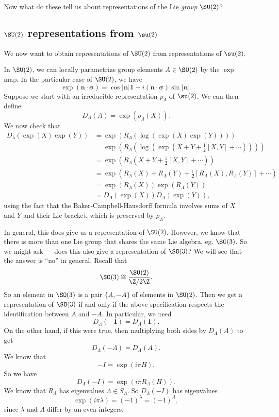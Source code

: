 \documentclass[a4paper]{article}
\begin{document}
Now what do these tell us about representations of the Lie \emph{group} $\SU(2)$?

\subsection{\texorpdfstring{$\SU(2)$}{SU(2)} representations from \texorpdfstring{$\su(2)$}{su(2)}}
We now want to obtain representations of $\SU(2)$ from representations of $\su(2)$.

In $\SU(2)$, we can locally parametrize group elements $A \in \SU(2)$ by the $\exp$ map. In the particular case of $\SU(2)$, we have
\[
  \exp(\mathbf{n}\cdot \boldsymbol \sigma) = \cos|\mathbf{n}| \mathbf{1} + i (\mathbf{n}\cdot \boldsymbol\sigma) \sin |\mathbf{n}|.
\]
Suppose we start with an irreducible representation $\rho_\Lambda$ of $\su(2)$. We can then define
\[
  D_{\Lambda}(A) = \exp(\rho_\Lambda(X)).
\]
We now check that
\begin{align*}
  D_\lambda(\exp(X) \exp(Y)) &= \exp(R_\Lambda(\log(\exp(X)\exp(Y))))\\
  &= \exp\left(R_\Lambda\left(\log\left(\exp\left(X + Y + \frac{1}{2}[X, Y] + \cdots\right)\right)\right)\right)\\
  &= \exp\left(R_\Lambda\left(X + Y + \frac{1}{2}[X, Y] + \cdots\right)\right)\\
  &= \exp\left(R_\Lambda(X) + R_\Lambda(Y) + \frac{1}{2}[R_\Lambda(X), R_\Lambda(Y)] + \cdots\right)\\
  &= \exp(R_\Lambda(X))\exp(R_\Lambda(Y))\\
  &= D_\Lambda(\exp(X)) D_\Lambda(\exp(Y)),
\end{align*}
using the fact that the Baker-Campbell-Hausdorff formula involves sums of $X$ and $Y$ and their Lie bracket, which is preserved by $\rho_\Lambda$.

In general, this does give us a representation of $\SU(2)$. However, we know that there is more than one Lie group that shares the same Lie algebra, eg. $\SO(3)$. So we might ask --- does this also give a representation of $\SO(3)$? We will see that the answer is ``no'' in general. Recall that
\[
  \SO(3) \cong \frac{\SU(2)}{\Z/2\Z}.
\]
So an element in $\SO(3)$ is a pair $\{A, -A\}$ of elements in $\SU(2)$. Then we get a representation of $\SO(3)$ if and only if the above specification respects the identification between $A$ and $-A$. In particular, we need
\[
  D_\Lambda(-\mathbf{1}) = D_\Lambda(\mathbf{1}).
\]
On the other hand, if this were true, then multiplying both sides by $D_\Lambda(A)$ to get
\[
  D_\Lambda(-A) = D_\Lambda(A).
\]
We know that
\[
  -I = \exp(i\pi H).
\]
So we have
\[
  D_\Lambda(-I) = \exp(i\pi R_\Lambda(H)).
\]
We know that $R_\Lambda$ has eigenvalues $\Lambda \in S_\Lambda$. So $D_\Lambda(-I)$ has eigenvalues
\[
  \exp(i\pi\lambda) = (-1)^\lambda = (-1)^\Lambda,
\]
since $\lambda$ and $\Lambda$ differ by an even integers.
\end{document}
